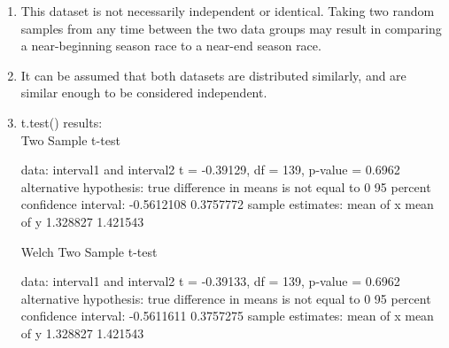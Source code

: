 \documentclass{article}
\begin{document}
\begin{enumerate}
\begin{multicols}{2}
\begin{tabular}{lr|}
                  interval2    & 1.421543
              \end{tabular}
              \\ \\
              Going by the given means, we can see that each interval is approximately the inverse of the \# of safety car deployments per half (i.e: interval \(\approx \frac{1}{\# of deployments}\)). This makes sense as the exponential distribution (time between deployments) is the distribution of the time between events, and the Poisson distribution (number of deployments within a timespan), are inversely related.
          \end{multicols}
    \item This dataset is not necessarily independent or identical. Taking two random samples from any time between the two data groups may result in comparing a near-beginning season race to a near-end season race.
    \item It can be assumed that both datasets are distributed similarly, and are similar enough to be considered independent.
    \item t.test() results:\\
          Two Sample t-test

          data:  interval1 and interval2
          t = -0.39129, df = 139, p-value = 0.6962
          alternative hypothesis: true difference in means is not equal to 0
          95 percent confidence interval:
          -0.5612108  0.3757772
          sample estimates:
          mean of x mean of y
          1.328827  1.421543


          Welch Two Sample t-test

          data:  interval1 and interval2
          t = -0.39133, df = 139, p-value = 0.6962
          alternative hypothesis: true difference in means is not equal to 0
          95 percent confidence interval:
          -0.5611611  0.3757275
          sample estimates:
          mean of x mean of y
          1.328827  1.421543
\end{enumerate}
\end{document}

